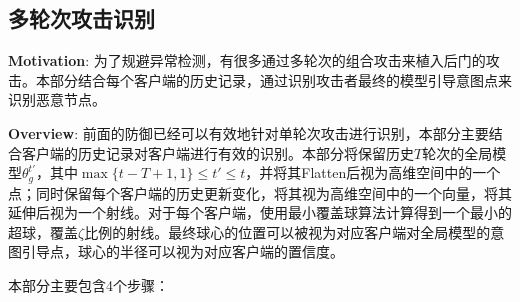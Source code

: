 \documentclass[lettersize,journal]{IEEEtran}
\begin{document}
\subsection{多轮次攻击识别}

\textbf{Motivation}: 为了规避异常检测，有很多通过多轮次的组合攻击来植入后门的攻击。本部分结合每个客户端的历史记录，通过识别攻击者最终的模型引导意图点来识别恶意节点。

\textbf{Overview}: 前面的防御已经可以有效地针对单轮次攻击进行识别，本部分主要结合客户端的历史记录对客户端进行有效的识别。本部分将保留历史$T$轮次的全局模型$\theta_g^{t'}$，其中$\max\{t-T+1, 1\}\leq  t'\leq t$，并将其Flatten后视为高维空间中的一个点；同时保留每个客户端的历史更新变化，将其视为高维空间中的一个向量，将其延伸后视为一个射线。对于每个客户端，使用最小覆盖球算法计算得到一个最小的超球，覆盖$\zeta$比例的射线。最终球心的位置可以被视为对应客户端对全局模型的意图引导点，球心的半径可以视为对应客户端的置信度。



本部分主要包含4个步骤：
\end{document}
